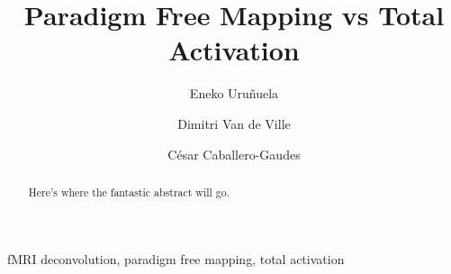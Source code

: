 \documentclass[5p]{elsarticle}
\begin{document}
\begin{frontmatter}

\title{Paradigm Free Mapping vs Total Activation}

\author[bcbl,upv]{Eneko Uru\~nuela}
\author[epfl,unige]{Dimitri Van de Ville}
\author[bcbl]{C\'{e}sar Caballero-Gaudes}

\address[bcbl]{Basque Center on Cognition, Brain and Language, Spain.}
\address[upv]{University of the Basque Country, Spain.}
\address[epfl]{Swiss Federal Institute of Technology Lausanne (EPFL), Route Cantonale, 1015 Lausanne, Switzerland.}
\address[unige]{Faculty of Medecine of the University of Geneva, Switzerland, Campus Biotech, Chemin des Mines 9, 1211 Geneva, Switzerland}

\begin{abstract}
Here's where the fantastic abstract will go.
\end{abstract}

\begin{keyword}
fMRI deconvolution, paradigm free mapping, total activation
\end{keyword}

\end{frontmatter}

\linenumbers











\end{document}
